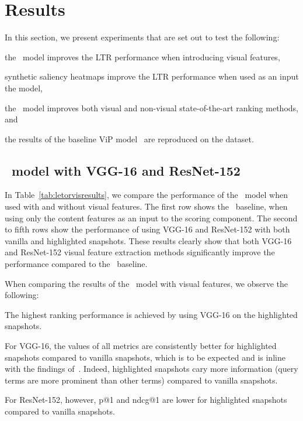 \section{Results}
In this section, we present experiments that are set out to test the following:
\begin{inparaenum}[(i)]
    \item the \modelname~model improves the \ac{LTR} performance when introducing visual features, 
    \item synthetic saliency heatmaps improve the \ac{LTR} performance when used as an input the \modelname{} model,
    \item the \modelname~model improves both visual and non-visual state-of-the-art ranking methods, and
    \item the results of the baseline ViP model~\cite{fan2017learning} are reproduced on the \datasetname{} dataset.
\end{inparaenum}

\subsection{\modelname~model with VGG-16 and ResNet-152}
In Table~\ref{tab:letorvisresults}, we compare the performance of the \modelname~model when used with and without visual features.
The first row shows the \modelname~baseline, when using only the content features as an input to the scoring component.
The second to fifth rows show the performance of using VGG-16 and ResNet-152 with both vanilla and highlighted snapshots. 
These results clearly show that both VGG-16 and ResNet-152 visual feature extraction methods significantly improve the performance compared to the \modelname~baseline. 

When comparing the results of the \modelname~model with visual features, we observe the following:
\begin{inparaenum}[(i)]
    \item The highest ranking performance is achieved by using VGG-16 on the highlighted snapshots.
    \item For VGG-16, the values of all metrics are consistently better for highlighted snapshots compared to vanilla snapshots, which is to be expected and is inline with the findings of~\cite{fan2017learning}. Indeed, highlighted snapshots cary more information (query terms are more prominent than other terms) compared to vanilla snapshots.
    \item For ResNet-152, however, p@1 and ndcg@1 are lower for highlighted snapshots compared to vanilla snapshots. 
\end{inparaenum}

